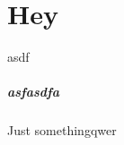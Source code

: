 \documentclass[../root.tex]{subfiles}
\begin{document}
\chapter{Hey}

asdf \cite{martinez2017relational,yoon2010probabilistic}

\paragraph{asfasdfa}

Just somethingqwer
\end{document}

